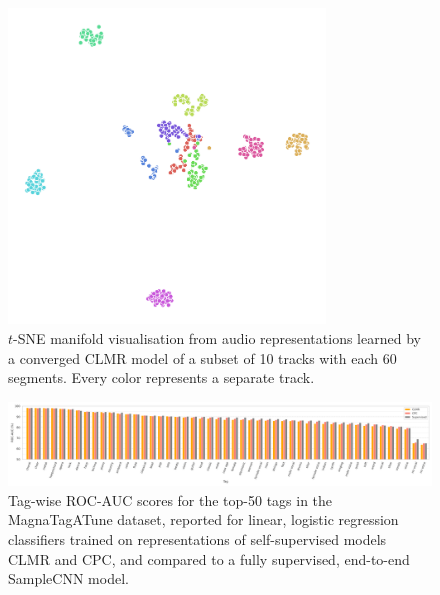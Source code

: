 \begin{figure}[h]
    \centering
    \includegraphics[width=0.75\textwidth]{figs/tsne-clmr.png}
    \caption{$t$-SNE manifold visualisation from audio representations learned by a converged CLMR model of a subset of 10 tracks with each 60 segments.
Every color represents a separate track.}
    \label{fig:tsne_manifold}
\end{figure}

\begin{figure}[h]
    \centering
    \includegraphics[width=\textwidth]{figs/tag_retrieval.png}
    \caption{Tag-wise ROC-AUC scores for the top-50 tags in the MagnaTagATune dataset, reported for linear, logistic regression classifiers trained on representations of self-supervised models CLMR and CPC, and compared to a fully supervised, end-to-end SampleCNN model.}
    \label{fig:tag_scores}
\end{figure}


